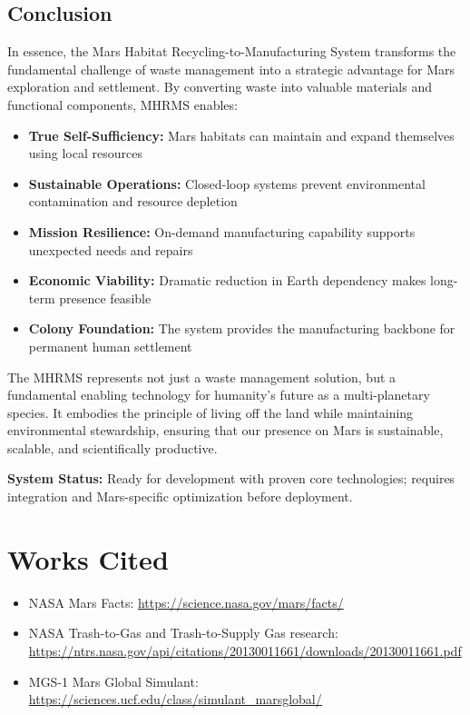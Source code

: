 \documentclass[12pt, a4paper]{article}
\begin{document}
\subsection{Conclusion}

In essence, the Mars Habitat Recycling-to-Manufacturing System transforms the fundamental challenge of waste management into a strategic advantage for Mars exploration and settlement. By converting waste into valuable materials and functional components, MHRMS enables:

\begin{itemize}
    \item \textbf{True Self-Sufficiency:} Mars habitats can maintain and expand themselves using local resources
    \item \textbf{Sustainable Operations:} Closed-loop systems prevent environmental contamination and resource depletion
    \item \textbf{Mission Resilience:} On-demand manufacturing capability supports unexpected needs and repairs
    \item \textbf{Economic Viability:} Dramatic reduction in Earth dependency makes long-term presence feasible
    \item \textbf{Colony Foundation:} The system provides the manufacturing backbone for permanent human settlement
\end{itemize}

The MHRMS represents not just a waste management solution, but a fundamental enabling technology for humanity's future as a multi-planetary species. It embodies the principle of living off the land while maintaining environmental stewardship, ensuring that our presence on Mars is sustainable, scalable, and scientifically productive.

\noindent\textbf{System Status:} Ready for development with proven core technologies; requires integration and Mars-specific optimization before deployment.

\section*{Works Cited}
\begin{itemize}
    \item NASA Mars Facts: \url{https://science.nasa.gov/mars/facts/}
    \item NASA Trash-to-Gas and Trash-to-Supply Gas research: \url{https://ntrs.nasa.gov/api/citations/20130011661/downloads/20130011661.pdf}
    \item MGS-1 Mars Global Simulant: \url{https://sciences.ucf.edu/class/simulant_marsglobal/}
\end{itemize}
\end{document}
